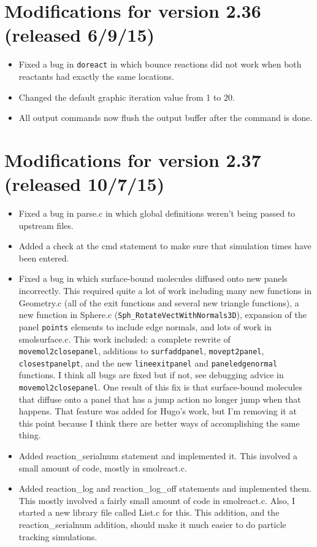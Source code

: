 \documentclass {scrbook}
\newcommand {\ttt} {\texttt}
\begin{document}
\section{Modifications for version 2.36 (released 6/9/15)}
\begin{itemize}
\item Fixed a bug in \ttt{doreact} in which bounce reactions did not work when both reactants had exactly the same locations.
\item Changed the default graphic iteration value from 1 to 20.
\item All output commands now flush the output buffer after the command is done.
\end{itemize}

\section{Modifications for version 2.37 (released 10/7/15)}
\begin{itemize}
\item Fixed a bug in parse.c in which global definitions weren't being passed to upstream files.
\item Added a check at the cmd statement to make sure that simulation times have been entered.
\item Fixed a bug in which surface-bound molecules diffused onto new panels incorrectly. This required quite a lot of work including many new functions in Geometry.c (all of the exit functions and several new triangle functions), a new function in Sphere.c (\ttt{Sph\_RotateVectWithNormals3D}), expansion of the panel \ttt{points} elements to include edge normals, and lots of work in smolsurface.c. This work included: a complete rewrite of \ttt{movemol2closepanel}, additions to \ttt{surfaddpanel}, \ttt{movept2panel}, \ttt{closestpanelpt}, and the new \ttt{lineexitpanel} and \ttt{paneledgenormal} functions. I think all bugs are fixed but if not, see debugging advice in \ttt{movemol2closepanel}. One result of this fix is that surface-bound molecules that diffuse onto a panel that has a jump action no longer jump when that happens. That feature was added for Hugo's work, but I'm removing it at this point because I think there are better ways of accomplishing the same thing.
\item Added reaction\_serialnum statement and implemented it. This involved a small amount of code, mostly in smolreact.c.
\item Added reaction\_log and reaction\_log\_off statements and implemented them. This mostly involved a fairly small amount of code in smolreact.c. Also, I started a new library file called List.c for this. This addition, and the reaction\_serialnum addition, should make it much easier to do particle tracking simulations.
\end{itemize}
\end{document}
